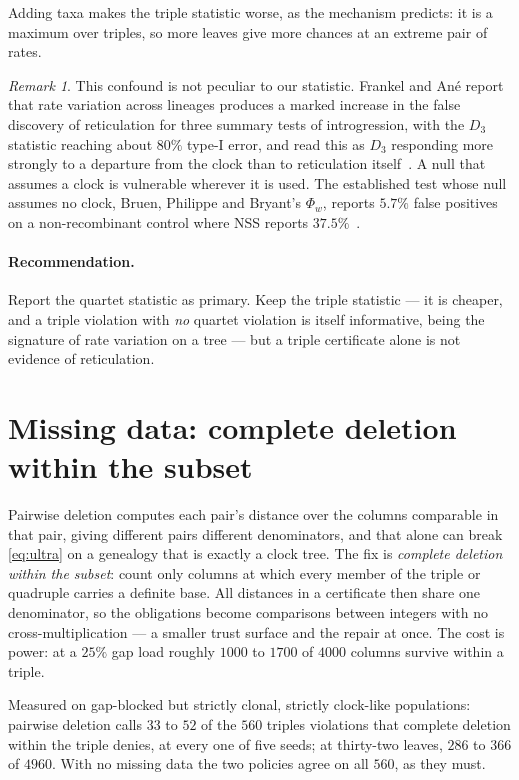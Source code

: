 \documentclass[11pt,a4paper]{article}
\theoremstyle{definition}
\theoremstyle{remark}
\newtheorem{remark}{Remark}[section]
\begin{document}
Adding taxa makes the triple statistic worse, as the mechanism predicts: it is a
maximum over triples, so more leaves give more chances at an extreme pair of
rates.

\begin{remark}
This confound is not peculiar to our statistic. Frankel and An\'e report that
rate variation across lineages produces a marked increase in the false discovery
of reticulation for three summary tests of introgression, with the $D_3$
statistic reaching about $80\%$ type-I error, and read this as $D_3$ responding
more strongly to a departure from the clock than to reticulation
itself~\cite{frankelane}. A null that assumes a clock is vulnerable wherever it
is used. The established test whose null assumes no clock, Bruen, Philippe and
Bryant's $\Phi_w$, reports $5.7\%$ false positives on a non-recombinant control
where NSS reports $37.5\%$~\cite{bruen}.
\end{remark}

\paragraph{Recommendation.} Report the quartet statistic as primary. Keep the
triple statistic --- it is cheaper, and a triple violation with \emph{no} quartet
violation is itself informative, being the signature of rate variation on a tree
--- but a triple certificate alone is not evidence of reticulation.

\section{Missing data: complete deletion within the subset}\label{sec:deletion}

Pairwise deletion computes each pair's distance over the columns comparable in
that pair, giving different pairs different denominators, and that alone can
break \eqref{eq:ultra} on a genealogy that is exactly a clock tree. The fix is
\emph{complete deletion within the subset}: count only columns at which every
member of the triple or quadruple carries a definite base. All distances in a
certificate then share one denominator, so the obligations become comparisons
between integers with no cross-multiplication --- a smaller trust surface and the
repair at once. The cost is power: at a $25\%$ gap load roughly $1000$ to $1700$
of $4000$ columns survive within a triple.

Measured on gap-blocked but strictly clonal, strictly clock-like populations:
pairwise deletion calls $33$ to $52$ of the $560$ triples violations that
complete deletion within the triple denies, at every one of five seeds; at
thirty-two leaves, $286$ to $366$ of $4960$. With no missing data the two
policies agree on all $560$, as they must.
\end{document}
